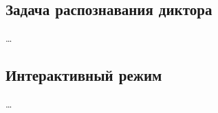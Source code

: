 \subsection{Задача распознавания диктора}
    \ldots

\subsection{Интерактивный режим}\label{ssec:isr}
    \ldots